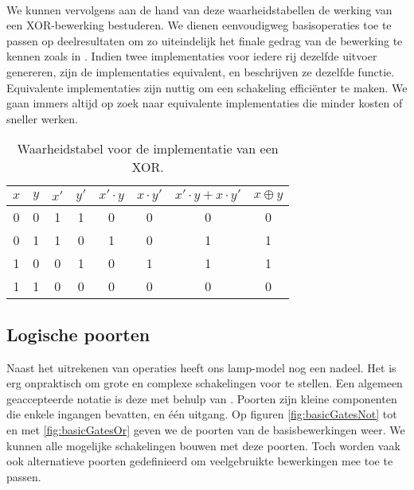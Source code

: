 \paragraph{}
We kunnen vervolgens aan de hand van deze waarheidstabellen de werking van een XOR-bewerking bestuderen. We dienen eenvoudigweg basisoperaties toe te passen op deelresultaten om zo uiteindelijk het finale gedrag van de bewerking te kennen zoals in . Indien twee implementaties voor iedere rij dezelfde uitvoer genereren, zijn de implementaties equivalent, en beschrijven ze dezelfde functie. Equivalente implementaties zijn nuttig om een schakeling effici\"enter te maken. We gaan immers altijd op zoek naar equivalente implementaties die minder kosten of sneller werken.
\begin{table}[htb]
\centering
\begin{tabular}{cc|ccccc|c}
$x$&$y$&$x'$&$y'$&$x'\cdot y$&$x\cdot y'$&$x'\cdot y+x\cdot y'$&$x\oplus y$\\\hline
0&0&1&1&0&0&0&0\\
0&1&1&0&1&0&1&1\\
1&0&0&1&0&1&1&1\\
1&1&0&0&0&0&0&0\\
\end{tabular}
\caption{Waarheidstabel voor de implementatie van een XOR.}
\label{tbl:truthTableXOR}
\end{table}
\subsection{Logische poorten}
\label{ss:logischePoorten}
Naast het uitrekenen van operaties heeft ons lamp-model nog een nadeel. Het is erg onpraktisch om grote en complexe schakelingen voor te stellen. Een algemeen geaccepteerde notatie is deze met behulp van . Poorten zijn kleine componenten die enkele ingangen bevatten, en \'e\'en uitgang. Op figuren \ref{fig:basicGatesNot} tot en met \ref{fig:basicGatesOr} geven we de poorten van de basisbewerkingen weer. We kunnen alle mogelijke schakelingen bouwen met deze poorten. Toch worden vaak ook alternatieve poorten gedefinieerd om veelgebruikte bewerkingen mee toe te passen.

